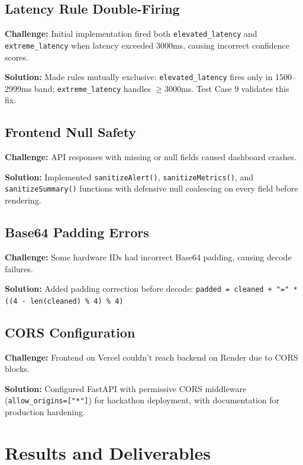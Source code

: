 \documentclass[12pt,a4paper]{article}
\begin{document}
\subsection{Latency Rule Double-Firing}

\textbf{Challenge:} Initial implementation fired both \texttt{elevated\_latency} and \texttt{extreme\_latency} when latency exceeded 3000ms, causing incorrect confidence scores.

\textbf{Solution:} Made rules mutually exclusive: \texttt{elevated\_latency} fires only in 1500--2999ms band; \texttt{extreme\_latency} handles $\geq$3000ms. Test Case 9 validates this fix.

\subsection{Frontend Null Safety}

\textbf{Challenge:} API responses with missing or null fields caused dashboard crashes.

\textbf{Solution:} Implemented \texttt{sanitizeAlert()}, \texttt{sanitizeMetrics()}, and \texttt{sanitizeSummary()} functions with defensive null coalescing on every field before rendering.

\subsection{Base64 Padding Errors}

\textbf{Challenge:} Some hardware IDs had incorrect Base64 padding, causing decode failures.

\textbf{Solution:} Added padding correction before decode: \texttt{padded = cleaned + "=" * ((4 - len(cleaned) \% 4) \% 4)}

\subsection{CORS Configuration}

\textbf{Challenge:} Frontend on Vercel couldn't reach backend on Render due to CORS blocks.

\textbf{Solution:} Configured FastAPI with permissive CORS middleware (\texttt{allow\_origins=["*"]}) for hackathon deployment, with documentation for production hardening.

\section{Results and Deliverables}
\end{document}
